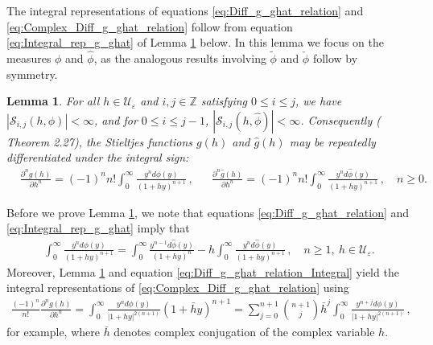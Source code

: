 \documentclass[english,12pt,jmp,graphicx]{revtex4-1}
\newtheorem{lemma}{Lemma}[section]
\newcommand{\ph}{\hat{\phi}}
\begin{document}
The integral representations of equations
\eqref{eq:Diff_g_ghat_relation} and
\eqref{eq:Complex_Diff_g_ghat_relation} follow from equation
\eqref{eq:Integral_rep_g_ghat} of Lemma \ref{lem:L1_Yij} below. In
this lemma we focus on the measures $\phi$ and $\ph$, as the analogous
results involving $\tilde{\phi}$ and $\check{\phi}$ follow by symmetry.


\begin{lemma}\label{lem:L1_Yij}  
  For all $h\in\mathcal{U}_\varepsilon$ and $i,j\in\mathbb{Z}$ satisfying $0\leq i\leq j$,
  we have $|\mathcal{S}_{i,j}(h,\phi)|<\infty$, and for $0\leq i\leq j-1$,
  $|\mathcal{S}_{i,j}(h,\ph)|<\infty$. Consequently (\cite{Folland:99}
  Theorem 2.27), the Stieltjes functions $g(h)$ and $\hat{g}(h)$ may
  be repeatedly differentiated under the integral sign: 
  \begin{align}\label{eq:Integral_rep_g_ghat}
    &\frac{\partial^ng(h)}{\partial h^n}%
                     =(-1)^nn!\int_0^\infty\frac{y^nd\phi(y)}{(1+hy)^{n+1}}\,,
         &&
    \frac{\partial^n\hat{g}(h)}{\partial h^n}%
                     =(-1)^nn!\int_0^\infty\frac{y^nd\ph(y)}{(1+hy)^{n+1}}\,,
                     \quad n\geq0.
  \end{align}
\end{lemma}
%

Before we prove Lemma \ref{lem:L1_Yij}, we note that equations
\eqref{eq:Diff_g_ghat_relation} and \eqref{eq:Integral_rep_g_ghat}
imply that
%
\begin{align}\label{eq:Diff_g_ghat_relation_Integral}
  \int_0^\infty \frac{y^nd\phi(y)}{(1+hy)^{n+1}}=\int_0^\infty\frac{y^{n-1}d\ph(y)}{(1+hy)^n} 
                                -h \int_0^\infty\frac{y^nd\ph(y)}{(1+hy)^{n+1}}
  \,, \quad   n\geq1, \ h\in\mathcal{U}_\varepsilon.               
\end{align}
%
Moreover, Lemma \ref{lem:L1_Yij} and equation
\eqref{eq:Diff_g_ghat_relation_Integral} yield the integral
representations of \eqref{eq:Complex_Diff_g_ghat_relation} using
%
\begin{align}\label{eq:Complex_Diff_g}
  \frac{(-1)^n}{n!}\frac{\partial^ng(h)}{\partial h^n}
   =\int_0^\infty\frac{y^nd\phi(y)}{|1+hy|^{2(n+1)}}(1+\bar{h}y)^{n+1}
   =\sum_{j=0}^{n+1}{n+1 \choose j}\bar{h}^j
                 \int_0^\infty\frac{y^{n+j}d\phi(y)}{|1+hy|^{2(n+1)}}\,,               
\end{align}
%
for example, where $\bar{h}$ denotes complex conjugation of the
complex variable $h$.
\end{document}
